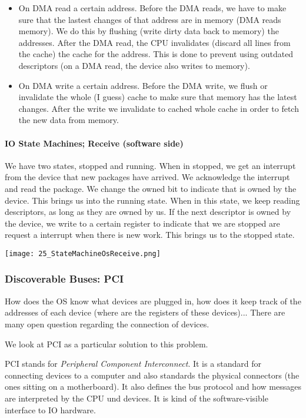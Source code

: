 \begin{itemize}
    \item On DMA read a certain address. Before the DMA reads, we have to make sure that the lastest changes of that address are in memory (DMA reads memory). We do this by flushing (write dirty data back to memory) the addresses. After the DMA read, the CPU invalidates (discard all lines from the cache) the cache for the address. This is done to prevent using outdated descriptors (on a DMA read, the device also writes to memory).
    \item On DMA write a certain address. Before the DMA write, we flush or invalidate the whole (I guess) cache to make sure that memory has the latest changes. After the write we invalidate to cached whole cache in order to fetch the new data from memory.
\end{itemize}

\paragraph{IO State Machines; Receive (software side)}
We have two states, stopped and running. When in stopped, we get an interrupt from the device that new packages have arrived. We acknowledge the interrupt and read the package. We change the owned bit to indicate that is owned by the device. This brings us into the running state. When in this state, we keep reading descriptors, as long as they are owned by us. If the next descriptor is owned by the device, we write to a certain register to indicate that we are stopped are request a interrupt when there is new work. This brings us to the stopped state.

\texttt{[image: 25\_StateMachineOsReceive.png]}

\subsubsection{Discoverable Buses: PCI}
How does the OS know what devices are plugged in, how does it keep track of the addresses of each device (where are the registers of these devices)... There are many open question regarding the connection of devices.

We look at PCI as a particular solution to this problem.

PCI stands for \textit{Peripheral Component Interconnect}. It is a standard for connecting devices to a computer and also standards the physical connectors (the ones sitting on a motherboard). It also defines the bus protocol and how messages are interpreted by the CPU und devices. It is kind of the software-visible interface to IO hardware.


